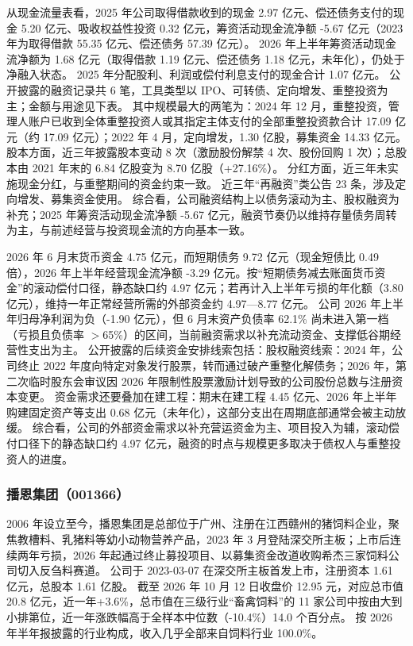  从现金流量表看，2025 年公司取得借款收到的现金 2.97 亿元、偿还债务支付的现金 5.20 亿元、吸收权益性投资 0.32 亿元，筹资活动现金流净额 -5.67 亿元（2023 年为取得借款 55.35 亿元、偿还债务 57.39 亿元）。 2026 年上半年筹资活动现金流净额为 1.68 亿元（取得借款 1.19 亿元、偿还债务 1.18 亿元，未年化），仍处于净融入状态。 2025 年分配股利、利润或偿付利息支付的现金合计 1.07 亿元。 公开披露的融资记录共 6 笔，工具类型以 IPO、可转债、定向增发、重整投资为主；金额与用途见下表。 其中规模最大的两笔为：2024 年 12 月，重整投资，管理人账户已收到全体重整投资人或其指定主体支付的全部重整投资款合计 17.09 亿元（约 17.09 亿元）；2022 年 4 月，定向增发，1.30 亿股，募集资金 14.33 亿元。 股本方面，近三年披露股本变动 8 次（激励股份解禁 4 次、股份回购 1 次）；总股本由 2021 年末的 6.84 亿股变为 8.70 亿股（+27.16\%）。 分红方面，近三年未实施现金分红，与重整期间的资金约束一致。 近三年“再融资”类公告 23 条，涉及定向增发、募集资金使用。 综合看，公司融资结构上以债务滚动为主、股权融资为补充；2025 年筹资活动现金流净额 -5.67 亿元，融资节奏仍以维持存量债务周转为主，与前述经营与投资现金流的方向基本一致。

 2026 年 6 月末货币资金 4.75 亿元，而短期债务 9.72 亿元（现金短债比 0.49 倍），2026 年上半年经营现金流净额 -3.29 亿元。按“短期债务减去账面货币资金”的滚动偿付口径，静态缺口约 4.97 亿元；若再计入上半年亏损的年化额（3.80 亿元），维持一年正常经营所需的外部资金约 4.97---8.77 亿元。 公司 2026 年上半年归母净利润为负（-1.90 亿元），但 6 月末资产负债率 62.1\% 尚未进入第一档（亏损且负债率 $>$65\%）的区间，当前融资需求以补充流动资金、支撑低谷期经营性支出为主。 公开披露的后续资金安排线索包括：股权融资线索：2024 年，公司终止 2022 年度向特定对象发行股票，转而通过破产重整化解债务；2026 年，第二次临时股东会审议因 2026 年限制性股票激励计划导致的公司股份总数与注册资本变更。 资金需求还要叠加在建工程：期末在建工程 4.45 亿元、2026 年上半年购建固定资产等支出 0.68 亿元（未年化），这部分支出在周期底部通常会被主动放缓。 综合看，公司的外部资金需求以补充营运资金为主、项目投入为辅，滚动偿付口径下的静态缺口约 4.97 亿元，融资的时点与规模更多取决于债权人与重整投资人的进度。




\subsubsection{播恩集团（001366）}
\label{co:001366}

 2006 年设立至今，播恩集团是总部位于广州、注册在江西赣州的猪饲料企业，聚焦教槽料、乳猪料等幼小动物营养产品，2023 年 3 月登陆深交所主板；上市后连续两年亏损，2026 年起通过终止募投项目、以募集资金改道收购希杰三家饲料公司切入反刍料赛道。 公司于 2023-03-07 在深交所主板首发上市，注册资本 1.61 亿元，总股本 1.61 亿股。 截至 2026 年 10 月 12 日收盘价 12.95 元，对应总市值 20.8 亿元，近一年+3.6\%，总市值在三级行业“畜禽饲料”的 11 家公司中按由大到小排第位，近一年涨跌幅高于全样本中位数（-10.4\%）14.0 个百分点。 按 2026 年半年报披露的行业构成，收入几乎全部来自饲料行业 100.0\%。

